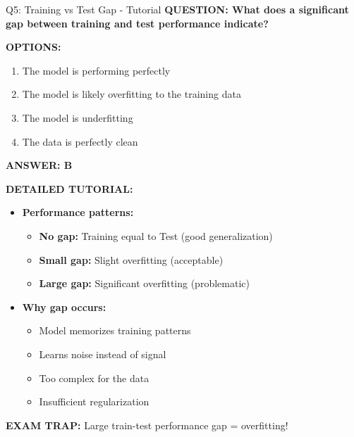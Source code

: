 \documentclass[8pt]{beamer}
\begin{document}
	\begin{frame}{Q5: Training vs Test Gap - Tutorial}
		\fontsize{6.5}{7.5}\selectfont
		\textbf{QUESTION: What does a significant gap between training and test performance indicate?}
		
		\vspace{0.1cm}
		\textbf{OPTIONS:}
		\begin{enumerate}
			\item The model is performing perfectly
			\item The model is likely overfitting to the training data
			\item The model is underfitting
			\item The data is perfectly clean
		\end{enumerate}
		
		\vspace{0.1cm}
		\textcolor{myblue}{\textbf{ANSWER: B}}
		
		\vspace{0.1cm}
		\textbf{DETAILED TUTORIAL:}
		\begin{itemize}
			\item \textbf{Performance patterns:}
			\begin{itemize}
				\item \textbf{No gap:} Training equal to Test (good generalization)
				\item \textbf{Small gap:} Slight overfitting (acceptable)
				\item \textbf{Large gap:} Significant overfitting (problematic)
			\end{itemize}
			\item \textbf{Why gap occurs:}
			\begin{itemize}
				\item Model memorizes training patterns
				\item Learns noise instead of signal
				\item Too complex for the data
				\item Insufficient regularization
			\end{itemize}
		\end{itemize}
		
		\textcolor{myred}{\textbf{EXAM TRAP:}} Large train-test performance gap = \textcolor{myblue}{overfitting}!
	\end{frame}
	
	
\end{document}
